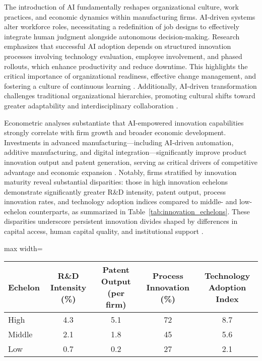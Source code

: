 \documentclass[sigconf]{acmart}
\begin{document}
The introduction of AI fundamentally reshapes organizational culture, work practices, and economic dynamics within manufacturing firms. AI-driven systems alter workforce roles, necessitating a redefinition of job designs to effectively integrate human judgment alongside autonomous decision-making. Research emphasizes that successful AI adoption depends on structured innovation processes involving technology evaluation, employee involvement, and phased rollouts, which enhance productivity and reduce downtime. This highlights the critical importance of organizational readiness, effective change management, and fostering a culture of continuous learning \cite{ref19,ref28}. Additionally, AI-driven transformation challenges traditional organizational hierarchies, promoting cultural shifts toward greater adaptability and interdisciplinary collaboration \cite{ref20,ref28}.

Econometric analyses substantiate that AI-empowered innovation capabilities strongly correlate with firm growth and broader economic development. Investments in advanced manufacturing—including AI-driven automation, additive manufacturing, and digital integration—significantly improve product innovation output and patent generation, serving as critical drivers of competitive advantage and economic expansion \cite{ref21,ref20}. Notably, firms stratified by innovation maturity reveal substantial disparities: those in high innovation echelons demonstrate significantly greater R\&D intensity, patent output, process innovation rates, and technology adoption indices compared to middle- and low-echelon counterparts, as summarized in Table~\ref{tab:innovation_echelons}. These disparities underscore persistent innovation divides shaped by differences in capital access, human capital quality, and institutional support \cite{ref21}.

\begin{table*}[htbp]
\centering
\caption{Innovation Activity Indicators Across Development Echelons in Manufacturing Industries \cite{ref21}}
\label{tab:innovation_echelons}
\begin{adjustbox}{max width=\textwidth}
\begin{tabular}{@{}lcccc@{}}
\toprule
Echelon & R\&D Intensity (\%) & Patent Output (per firm) & Process Innovation (\%) & Technology Adoption Index \\ \midrule
High & 4.3 & 5.1 & 72 & 8.7 \\
Middle & 2.1 & 1.8 & 45 & 5.6 \\
Low & 0.7 & 0.2 & 27 & 2.1 \\
\bottomrule
\end{tabular}
\end{adjustbox}
\end{table*}
\end{document}
